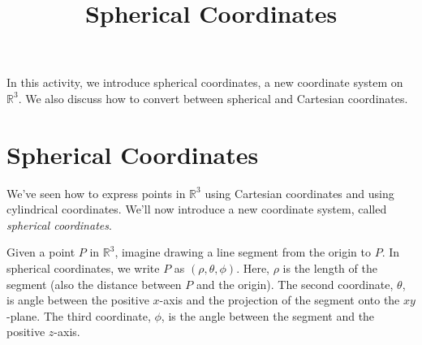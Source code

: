 \documentclass{ximera}
\title{Spherical Coordinates}
\begin{document}
\begin{abstract}
\end{abstract}
\maketitle

In this activity, we introduce spherical coordinates, a new coordinate system on $\mathbb{R}^3$. We also discuss how to convert between spherical and Cartesian coordinates.

\section{Spherical Coordinates}

We've seen how to express points in $\mathbb{R}^3$ using Cartesian coordinates and using cylindrical coordinates. We'll now introduce a new coordinate system, called \emph{spherical coordinates}.

Given a point $P$ in $\mathbb{R}^3$, imagine drawing a line segment from the origin to $P$. In spherical coordinates, we write $P$ as $(\rho, \theta, \phi)$. Here, $\rho$ is the length of the segment (also the distance between $P$ and the origin). The second coordinate, $\theta$, is angle between the positive $x$-axis and the projection of the segment onto the $xy$-plane. The third coordinate, $\phi$, is the angle between the segment and the positive $z$-axis.
\end{document}
